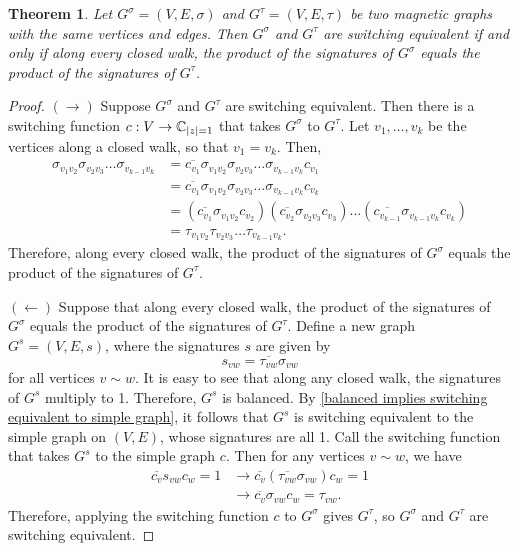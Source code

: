 \documentclass[12pt]{article}
\newtheorem{thm}{Theorem}
\theoremstyle{definition}
\newcommand{\C}{\mathbb C}
\DeclarePairedDelimiter\abs{\lvert}{\rvert}%
\begin{document}
\begin{thm}\label{closed walk characterization of switching equivalence}
Let $G^\sigma = (V, E, \sigma)$ and $G^\tau = (V, E, \tau)$ be two magnetic graphs with the same vertices and edges. Then $G^\sigma$ and $G^\tau$ are switching equivalent if and only if along every closed walk, the product of the signatures of $G^\sigma$ equals the product of the signatures of $G^\tau$.
\end{thm}
\begin{proof}
$(\rightarrow)$ Suppose $G^\sigma$ and $G^\tau$ are switching equivalent. Then there is a switching function $c: V \rightarrow \C_{\abs*z = 1}$ that takes $G^\sigma$ to $G^\tau$. Let $v_1, \dots, v_k$ be the vertices along a closed walk, so that $v_1 = v_k$. Then,
\begin{align*}
\sigma_{v_1 v_2} \sigma_{v_2 v_3} \dots \sigma_{v_{k-1} v_k}
&= \overline{c_{v_1}} \sigma_{v_1 v_2} \sigma_{v_2 v_3} \dots \sigma_{v_{k-1} v_k} c_{v_1} \\
&= \overline{c_{v_1}} \sigma_{v_1 v_2} \sigma_{v_2 v_3} \dots \sigma_{v_{k-1} v_k} c_{v_k} \\
&= (\overline{c_{v_1}} \sigma_{v_1 v_2} c_{v_2}) (\overline{c_{v_2}} \sigma_{v_2 v_3} c_{v_3}) \dots (\overline{c_{v_{k-1}}} \sigma_{v_{k-1} v_k} c_{v_k}) \\
&= \tau_{v_1 v_2} \tau_{v_2 v_3} \dots \tau_{v_{k-1} v_k}.
\end{align*} 
Therefore, along every closed walk, the product of the signatures of $G^\sigma$ equals the product of the signatures of $G^\tau$.

$(\leftarrow)$ Suppose that along every closed walk, the product of the signatures of $G^\sigma$ equals the product of the signatures of $G^\tau$. Define a new graph $G^s = (V, E, s)$, where the signatures $s$ are given by 
$$s_{vw} = \overline{\tau_{vw}} \sigma_{vw}$$ 
for all vertices $v \sim w$. It is easy to see that along any closed walk, the signatures of $G^s$ multiply to 1. Therefore, $G^s$ is balanced. By \cref{balanced implies switching equivalent to simple graph}, it follows that $G^s$ is switching equivalent to the simple graph on $(V, E)$, whose signatures are all 1. Call the switching function that takes $G^s$ to the simple graph $c$. Then for any vertices $v \sim w$, we have
\begin{align*}
\overline{c_v} s_{vw} c_w = 1
&\rightarrow \overline{c_v} \left(\overline{\tau_{vw}} \sigma_{vw}\right) c_w = 1 \\
&\rightarrow \overline{c_v} \sigma_{vw} c_w = \tau_{vw}.
\end{align*}
Therefore, applying the switching function $c$ to $G^\sigma$ gives $G^\tau$, so $G^\sigma$ and $G^\tau$ are switching equivalent.
\end{proof}
\end{document}
